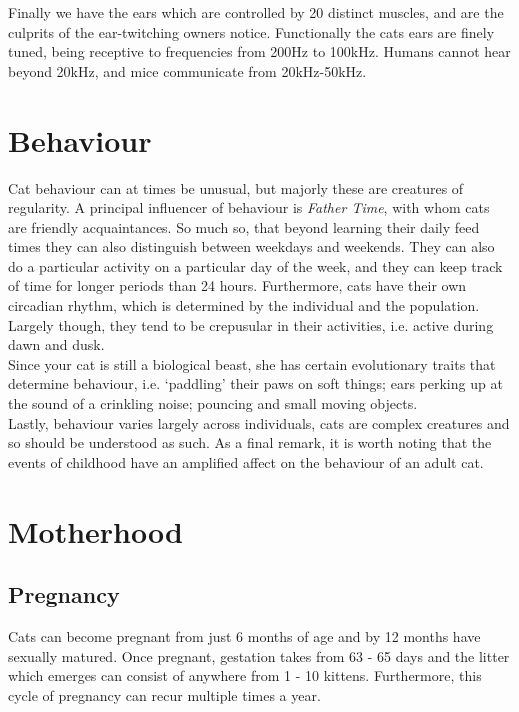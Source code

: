 \documentclass{article}
\begin{document}
Finally we have the ears which are controlled by 20 distinct muscles, and are the culprits of the ear-twitching owners notice. Functionally the cats ears are finely tuned, being receptive to frequencies from 200Hz to 100kHz. Humans cannot hear beyond 20kHz, and mice communicate from 20kHz-50kHz. 

\section*{Behaviour}
Cat behaviour can at times be unusual, but majorly these are creatures of regularity. A principal influencer of behaviour is \emph{Father Time}, with whom cats are friendly acquaintances. So much so, that beyond learning their daily feed times they can also distinguish between weekdays and weekends. They can also do a particular activity on a particular day of the week, and they can keep track of time for longer periods than 24 hours. Furthermore, cats have their own circadian rhythm, which is determined by the individual and the population. Largely though, they tend to be crepusular in their activities, i.e. active during dawn and dusk.\\

Since your cat is still a biological beast, she has certain evolutionary traits that determine behaviour, i.e. `paddling' their paws on soft things; ears perking up at the sound of a crinkling noise; pouncing and small moving objects.\\

Lastly, behaviour varies largely across individuals, cats are complex creatures and so should be understood as such. As a final remark, it is worth noting that the events of childhood have an amplified affect on the behaviour of an adult cat.

\section*{Motherhood}

\subsection*{Pregnancy}
Cats can become pregnant from just 6 months of age and by 12 months have sexually matured. Once pregnant, \gls{gestation} takes from 63 - 65 days and the litter which emerges can consist of anywhere from 1 - 10 kittens. Furthermore, this cycle of pregnancy can recur multiple times a year.\\
\end{document}

